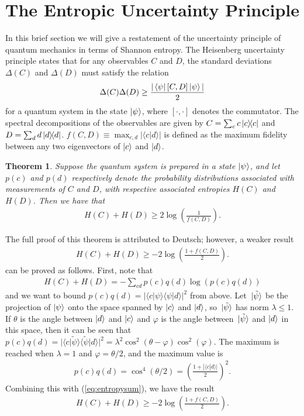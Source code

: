 \documentclass[a4paper, 12pt]{article}
\numberwithin{equation}{section}
\numberwithin{figure}{section}
\newtheorem{theorem}{Theorem}[section]
\theoremstyle{definition}
\begin{document}
    \section{The Entropic Uncertainty Principle}
    In this brief section we will give a restatement of the uncertainty principle of quantum mechanics in terms of Shannon entropy. The Heisenberg uncertainty principle states that for any observables $C$ and $D$, the standard deviations $\Delta(C)$ and $\Delta(D)$ must satisfy the relation
    \begin{align}
        \Delta(C) \Delta(D) \geq \frac{|\bra{\psi}[C, D]\ket{\psi}|}{2}
    \end{align}
    for a quantum system in the state $\ket{\psi}$, where $[\cdot, \cdot]$ denotes the commutator. The spectral decompositions of the observables are given by $C = \sum_c c \dyad{c}{c}$ and $D = \sum_d d \dyad{d}{d}$. $f(C, D) \equiv \max_{c, d} | \langle c | d \rangle |$ is defined as the maximum fidelity between any two eigenvectors of $\ket{c}$ and $\ket{d}$.
    \begin{theorem}
        Suppose the quantum system is prepared in a state $\ket{\psi}$, and let $p(c)$ and $p(d)$ respectively denote the probability distributions associated with measurements of $C$ and $D$, with respective associated entropies $H(C)$ and $H(D)$. Then we have that
        \begin{align}
            H(C) + H(D) \geq 2\log \left( \frac{1}{f(C, D)} \right).
        \end{align}
    \end{theorem}
    The full proof of this theorem is attributed to Deutsch; however, a weaker result
    \begin{align}
        H(C) + H(D) \geq -2\log \left( \frac{1 + f(C, D)}{2} \right).
    \end{align}
    can be proved as follows. First, note that
    \begin{align}
        H(C) + H(D) = -\sum_{cd} p(c) q(d) \log(p(c)q(d)) \label{eq:entropysum}
    \end{align}
    and we want to bound $p(c)q(d) = |\langle c | \psi \rangle \langle \psi | d \rangle|^2$ from above.
    Let $\ket*{\tilde{\psi}}$ be the projection of $\ket{\psi}$ onto the space spanned by $\ket{c}$ and $\ket{d}$, so $\ket*{\tilde{\psi}}$ has norm $\lambda \leq 1$.
    If $\theta$ is the angle between $\ket{d}$ and $\ket{c}$ and $\varphi$ is the angle between $\ket*{\tilde{\psi}}$ and $\ket{d}$ in this space, then it can be seen that $p(c)q(d) = |\langle c | \tilde{\psi} \rangle \langle \tilde{\psi} | d \rangle|^2 = \lambda^2 \cos^2(\theta - \varphi) \cos^2(\varphi)$.
    The maximum is reached when $\lambda = 1$ and $\varphi = \theta / 2$, and the maximum value is
    \begin{align}
        p(c)q(d) = \cos^4(\theta / 2) = \left( \frac{1 + |\langle c | d \rangle|}{2} \right)^2.
    \end{align}
    Combining this with (\ref{eq:entropysum}), we have the result
    \begin{align}
        H(C) + H(D) \geq -2\log \left( \frac{1 + f(C, D)}{2} \right).
    \end{align}
\end{document}
